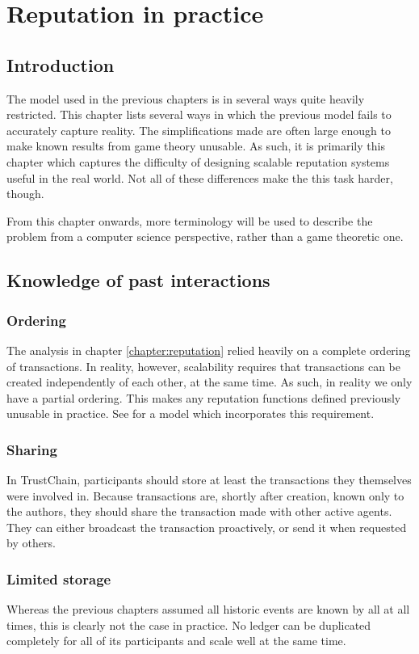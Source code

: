 \chapter{Reputation in practice}
\section{Introduction}
The model used in the previous chapters is in several ways quite heavily restricted. This chapter lists several ways in which the previous model fails to accurately capture reality. The simplifications made are often large enough to make known results from game theory unusable. As such, it is primarily this chapter which captures the difficulty of designing scalable reputation systems useful in the real world. Not all of these differences make the this task harder, though.

From this chapter onwards, more terminology will be used to describe the problem from a computer science perspective, rather than a game theoretic one.

\section{Knowledge of past interactions}
\subsection{Ordering}
The analysis in chapter \ref{chapter:reputation} relied heavily on a complete ordering of transactions. In reality, however, scalability requires that transactions can be created independently of each other, at the same time. As such, in reality we only have a partial ordering. This makes any reputation functions defined previously unusable in practice. See \cite{otte2016sybil} for a model which incorporates this requirement.

\subsection{Sharing}
In TrustChain, participants should store at least the transactions they themselves were involved in. Because transactions are, shortly after creation, known only to the authors, they should share the transaction made with other active agents. They can either broadcast the transaction proactively, or send it when requested by others.

\subsection{Limited storage}
Whereas the previous chapters assumed all historic events are known by all at all times, this is clearly not the case in practice. No ledger can be duplicated completely for all of its participants and scale well at the same time.

